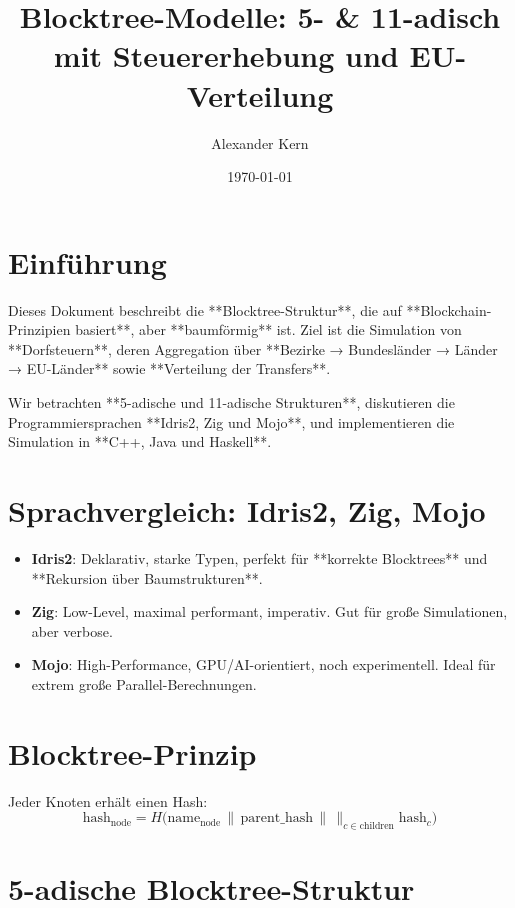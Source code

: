 \documentclass[a4paper,12pt]{article}
\title{Blocktree-Modelle: 5- & 11-adisch mit Steuererhebung und EU-Verteilung}
\author{Alexander Kern}
\date{\today}
\begin{document}
\maketitle

\section{Einführung}

Dieses Dokument beschreibt die **Blocktree-Struktur**, die auf **Blockchain-Prinzipien basiert**, aber **baumförmig** ist.  
Ziel ist die Simulation von **Dorfsteuern**, deren Aggregation über **Bezirke → Bundesländer → Länder → EU-Länder** sowie **Verteilung der Transfers**.  

Wir betrachten **5-adische und 11-adische Strukturen**, diskutieren die Programmiersprachen **Idris2, Zig und Mojo**, und implementieren die Simulation in **C++, Java und Haskell**.

\section{Sprachvergleich: Idris2, Zig, Mojo}

\begin{itemize}
\item \textbf{Idris2}: Deklarativ, starke Typen, perfekt für **korrekte Blocktrees** und **Rekursion über Baumstrukturen**.  
\item \textbf{Zig}: Low-Level, maximal performant, imperativ. Gut für große Simulationen, aber verbose.  
\item \textbf{Mojo}: High-Performance, GPU/AI-orientiert, noch experimentell. Ideal für extrem große Parallel-Berechnungen.
\end{itemize}

\section{Blocktree-Prinzip}

Jeder Knoten erhält einen Hash:
\[
\text{hash}_\text{node} = H\Big(\text{name}_\text{node} \,\|\, \text{parent\_hash} \,\|\, \big\|_{c \in \text{children}} \text{hash}_c \Big)
\]

\section{5-adische Blocktree-Struktur}

\begin{center}
\end{center}
\end{document}
